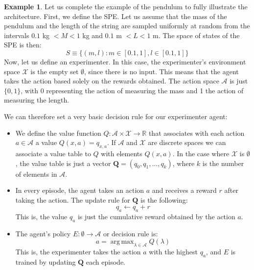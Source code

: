 \documentclass[11pt,a4paper,twoside]{report}
\DeclareMathOperator*{\argmax}{arg\,max}
\newcommand{\+}{\textnormal{+} }
\theoremstyle{definition}
\newtheorem{myex}[mythm]{Example}
\numberwithin{equation}{chapter}
\begin{document}
\begin{myex}
Let us complete the example of the pendulum to fully illustrate the architecture.
First, we define the SPE. Let us assume that the mass of the pendulum and the
length of the string are sampled uniformly at random from the intervals \break
$0.1$ kg $< M < 1$ kg and $ 0.1$ m $<L<1 $ m. The space of states of the SPE
is then:
 \begin{equation}
  S\equiv \{(m,l):m \in \left[0.1, 1\right],l \in [0.1,1]\}
 \end{equation}
Now, let us define an experimenter. In this case, the experimenter's environment
space $\mathcal{X}$ is the empty set $\emptyset$, since there is no input. This
means that the agent takes the action based solely on the rewards obtained. The
action space $\mathcal{A}$ is just $\{0,1\}$, with 0 representing the action of
measuring the mass and 1 the action of measuring the length.

We can therefore set a very basic decision rule for our experimenter agent:

\begin{itemize}
  \item We define the value function $Q:\mathcal{A}\times
  \mathcal{X}\rightarrow\mathbb{R}$ that associates with each action $a \in
  \mathcal{A}$ a value $Q(x,a)=q_{x,a}$. If $\mathcal{A}$ and $\mathcal{X}$ are discrete
  spaces we can associate a value table to $Q$ with elements $Q(x,a)$. In the 
  case where $\mathcal{X}$ is $\emptyset$, the value table is just a vector 
  $\mathbb{\textbf{Q}}=(q_0,q_1,...,q_{k})$, where $k$ is the number of elements
  in $\mathcal{A}.$
  \item  In every episode, the agent takes an action $a$ and receives a reward $r$
  after taking the action.
  The update rule for $\textbf{Q}$ is the following:
  \begin{equation}
    q_a\leftarrow q_a + r
    \label{update_rule1}
  \end{equation}
  This is, the value $q_a$ is just the cumulative reward obtained by the 
  action $a$. 
  \item The agent's policy $E:\emptyset  \rightarrow \mathcal{A}$ or 
  decision rule is:
  \begin{equation}
    a = \argmax_{\lambda \in \mathcal{A}} Q(\lambda)
    \label{argmax_policy}
  \end{equation}
  This is, the experimenter takes the action $a$ with the highest $q_a$, and 
  $E$ is trained by updating $\textbf{Q}$ each episode.
\end{itemize}


\end{myex}
\end{document}
